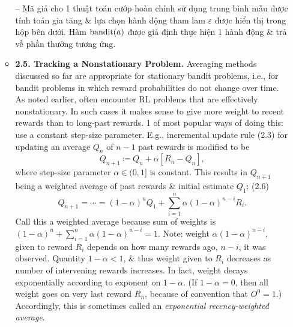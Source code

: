 \documentclass{article}
\begin{document}
\begin{itemize}
\begin{itemize}
        -- Mã giả cho 1 thuật toán cướp hoàn chỉnh sử dụng trung bình mẫu được tính toán gia tăng \& lựa chọn hành động tham lam $\varepsilon$ được hiển thị trong hộp bên dưới. Hàm ${\rm bandit}(a)$ được giả định thực hiện 1 hành động \& trả về phần thưởng tương ứng.
        \item {\bf2.5. Tracking a Nonstationary Problem.} Averaging methods discussed so far are appropriate for stationary bandit problems, i.e., for bandit problems in which reward probabilities do not change over time. As noted earlier, often encounter RL problems that are effectively nonstationary. In such cases it makes sense to give more weight to recent rewards than to long-past rewards. 1 of most popular ways of doing this: use a constant step-size parameter. E.g., incremental update rule (2.3) for updating an average $Q_n$ of $n - 1$ past rewards is modified to be
        \begin{equation*}
            Q_{n+1}\coloneqq Q_n + \alpha[R_n - Q_n],
        \end{equation*}
        where step-size parameter $\alpha\in(0,1]$ is constant. This results in $Q_{n+1}$ being a weighted average of past rewards \& initial estimate $Q_1$: (2.6)
        \begin{equation*}
            Q_{n+1} = \cdots = (1 - \alpha)^nQ_1 + \sum_{i=1}^n \alpha(1 - \alpha)^{n - i}R_i.
        \end{equation*}
        Call this a weighted average because sum of weights is $(1 - \alpha)^n + \sum_{i=1}^n \alpha(1 - \alpha)^{n - i} = 1$. Note: weight $\alpha(1 - \alpha)^{n-i}$, given to reward $R_i$ depends on how many rewards ago, $n - i$, it was observed. Quantity $1 - \alpha < 1$, \& thus weight given to $R_i$ decreases as number of intervening rewards increases. In fact, weight decays exponentially according to exponent on $1 - \alpha$. (If $1 - \alpha = 0$, then all weight goes on very last reward $R_n$, because of convention that $O^0 = 1$.) Accordingly, this is sometimes called an {\it exponential recency-weighted average}.


\end{itemize}
\end{itemize}
\end{document}
